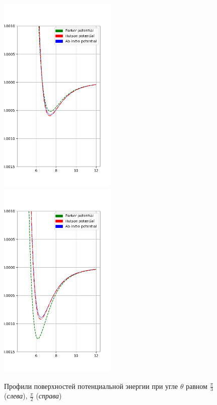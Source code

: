 \begin{figure}[!h]
	\includegraphics[width=0.5\textwidth]{pictures/potential_profiles_pi3.png}
	\includegraphics[width=0.5\textwidth]{pictures/potential_profiles_pi2.png}
	\caption{Профили поверхностей потенциальной энергии при угле $\theta$ равном $\frac{\pi}{3}$ (\textit{слева}), $\frac{\pi}{2}$ (\textit{справа})} 
\end{figure}

